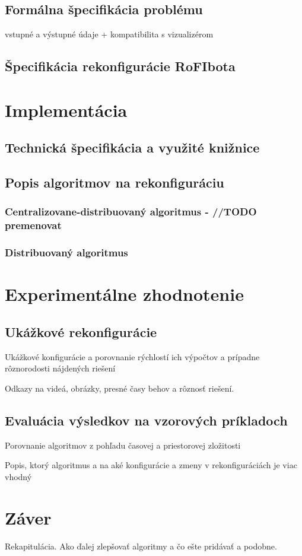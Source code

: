 \documentclass[
  digital, %
  twoside, %
  table,   %
  nolof,     %
  nolot,     %
]{fithesis3}
\begin{document}
\section{Formálna špecifikácia problému}
\label{sec:inputOutput}
vstupné a výstupné údaje + kompatibilita s vizualizérom

\section{Špecifikácia rekonfigurácie RoFIbota}
\label{sec:reconfigActions}


\chapter{Implementácia}
\section{Technická špecifikácia a využité knižnice}
\section{Popis algoritmov na rekonfiguráciu}
\subsection{Centralizovane-distribuovaný algoritmus - //TODO premenovat}
\subsection{Distribuovaný algoritmus}

\chapter{Experimentálne zhodnotenie}
\section{Ukážkové rekonfigurácie}
Ukážkové konfigurácie a porovnanie rýchlostí ich výpočtov a prípadne rôznorodosti nájdených riešení

Odkazy na videá, obrázky, presné časy behov a rôznosť riešení. 
\section{Evaluácia výsledkov na vzorových príkladoch}
Porovnanie algoritmov z pohľadu časovej a priestorovej zložitosti

Popis, ktorý algoritmus a na aké konfigurácie a zmeny v rekonfiguráciách je viac vhodný

\chapter{Záver}
Rekapitulácia. 
Ako ďalej zlepšovať algoritmy a čo ešte pridávať a podobne. 

  \printbibliography[heading=bibintoc] %
\end{document}
